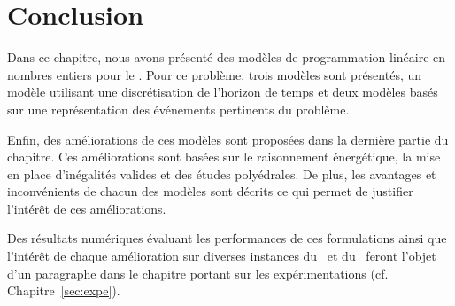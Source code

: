 \section*{Conclusion}

Dans ce chapitre, nous avons présenté des modèles de programmation
linéaire en nombres entiers pour le \CECSP. Pour ce problème, trois
modèles sont présentés,  
un modèle utilisant une discrétisation de l'horizon de temps et deux
modèles basés sur une représentation des événements pertinents du
problème. 

Enfin, des améliorations de ces modèles sont proposées dans la
dernière partie du chapitre. Ces améliorations sont basées sur le
raisonnement énergétique, la mise en place d'inégalités valides et des
études polyédrales. De plus, les avantages et inconvénients de chacun
des modèles sont décrits ce qui permet de justifier l'intérêt de ces
améliorations. 

Des résultats numériques évaluant les performances de ces formulations
ainsi que l'intérêt de chaque amélioration sur diverses instances du
\CECSP~et du \RCPSP~feront l'objet d'un paragraphe dans le chapitre
portant sur les expérimentations (cf. Chapitre~\ref{sec:expe}). 